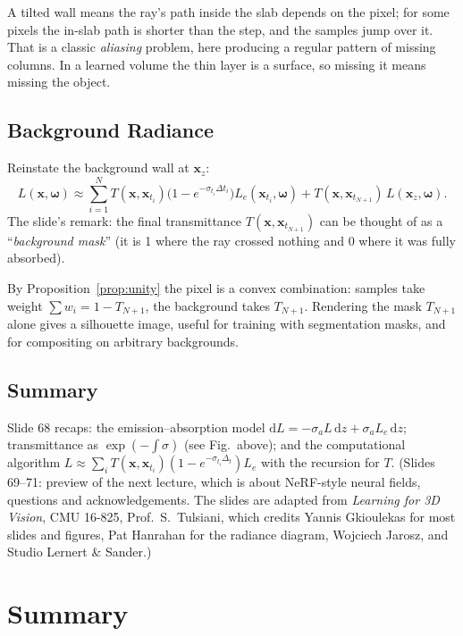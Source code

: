 \documentclass[11pt,a4paper]{article}
\newcommand{\x}{{\bm{x}}}
\newcommand{\w}{{\bm{\omega}}}
\theoremstyle{definition}
\theoremstyle{plain}
\theoremstyle{remark}
\begin{document}
\begin{intuition}
A tilted wall means the ray's path inside the slab depends on the pixel; for some pixels the in-slab path is shorter than the step, and the samples jump over it. That is a classic \emph{aliasing} problem, here producing a regular pattern of missing columns. In a learned volume the thin layer is a surface, so missing it means missing the object.
\end{intuition}

\subsection{Background Radiance}

Reinstate the background wall at $\x_z$:
\[
L(\x,\w)\approx\sum_{i=1}^NT(\x,\x_{t_i})\bigl(1-e^{-\sigma_{t_i}\Delta t_i}\bigr)L_e(\x_{t_i},\w)+T(\x,\x_{t_{N+1}})\,L(\x_z,\w).
\]
The slide's remark: the final transmittance $T(\x,\x_{t_{N+1}})$ can be thought of as a ``\emph{background mask}'' (it is 1 where the ray crossed nothing and 0 where it was fully absorbed).

\begin{intuition}
By Proposition~\ref{prop:unity} the pixel is a convex combination: samples take weight $\sum w_i=1-T_{N+1}$, the background takes $T_{N+1}$. Rendering the mask $T_{N+1}$ alone gives a silhouette image, useful for training with segmentation masks, and for compositing on arbitrary backgrounds.
\end{intuition}

\subsection{Summary}

Slide 68 recaps: the emission--absorption model $\mathrm dL=-\sigma_aL\,\mathrm dz+\sigma_aL_e\,\mathrm dz$; transmittance as $\exp(-\int\sigma)$ (see Fig.\ above); and the computational algorithm $L\approx\sum_iT(\x,\x_{t_i})(1-e^{-\sigma_{t_i}\Delta_t})L_e$ with the recursion for $T$. (Slides 69--71: preview of the next lecture, which is about NeRF-style neural fields, questions and acknowledgements. The slides are adapted from \emph{Learning for 3D Vision}, CMU 16-825, Prof.\ S.~Tulsiani, which credits Yannis Gkioulekas for most slides and figures, Pat Hanrahan for the radiance diagram, Wojciech Jarosz, and Studio Lernert \& Sander.)

\section{Summary}
\end{document}
